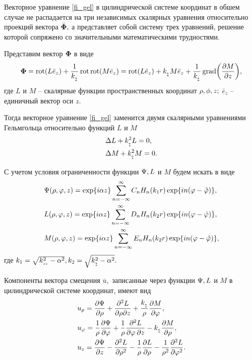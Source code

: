 Векторное уравнение \eqref{fi_gel} в цилиндрической системе координат в обшем случае не распадается на три независимых скалярных уравнения относительно проекций вектора $\bar{\F},$ а представляет собой систему трех уравнений, решение которой сопряжено со значительными математическими трудностями.

Представим вектор $\F$ в виде
$$\F=\rot(L\bar{e}_z)+\frac1{k_{\popr}}\rot\rot(M\bar{e}_z)=\rot(L\bar{e}_z)+k_{\popr} M\bar{e}_z+\frac1{k_{\popr}}\grad\biggl(\frac{\partial M}{\partial z}\biggr),$$
где $L$ и $M$ -- скалярные функции пространственных координат $\r, \phi, z;$ $\bar{e}_z$ -- единичный вектор оси $z.$

Тогда векторное уравнение \eqref{fi_gel} заменится двумя скалярными уравнениями Гельмгольца относительно функций $L$ и $M$
\begin{align*}
&\Lap L+k_{\popr}^2L=0,\\
&\Lap M+k_{\popr}^2M=0.
\end{align*}

С учетом условия ограниченности функции $\P, L$ и $M$ будем искать в виде
\begin{align}
&\P(\r, \f, z)= \exp\{i\alpha z\}\sum_{n=-\infty}^{\infty}C_nH_n(k_1 r)\exp\{in(\f-\hat\f)\},\\
&L(\r, \f, z)= \exp\{i\alpha z\}\sum_{n=-\infty}^{\infty}D_nH_n(k_2 r)\exp\{in(\f-\hat\f)\},\\
&M(\r, \f, z)= \exp\{i\alpha z\}\sum_{n=-\infty}^{\infty}E_nH_n(k_2 r)\exp\{in(\f-\hat\f)\},
\end{align}
где $k_1=\sqrt{k_{\prodol}^2-\alpha^2}, k_2=\sqrt{k_{\popr}^2-\alpha^2}.$

Компоненты вектора смещения $\bar{u},$ записанные через функции $\P, L$ и $M$ в цилиндрической системе координат, имеют вид
\begin{align}
&u_{\r}=\frac{\partial \P}{\partial\r}+\frac{\partial^2 L}{\partial\r\partial z}+\frac{k_{\popr}}{\r}\frac{\partial M}{\partial \f},\\
&u_\f=\frac{1}{\r}\frac{\partial \P}{\partial \f}+\frac{1}{\r}\frac{\partial^{2} L}{\partial\f\: \partial z}-k_{\popr}\frac{\partial M}{\partial \r},\\
&u_z=\frac{\partial\P}{\partial z}-\frac{\partial^{2} L}{\partial \r^{2}}-\frac{1}{\r}\frac{\partial L}{\partial \r}-\frac{1}{\r^2}\frac{\partial^{2}L}{\partial\f^{2}}.
\end{align}

